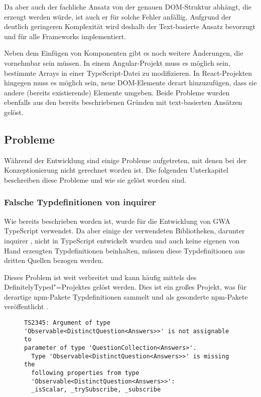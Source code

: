Da aber auch der fachliche Ansatz von der genauen \gls{DOM}-Struktur abhängt, die erzeugt werden würde, ist auch er für solche Fehler anfällig. Aufgrund der deutlich geringeren Komplexität wird deshalb der Text-basierte Ansatz bevorzugt und für alle Frameworks implementiert.

Neben dem Einfügen von Komponenten gibt es noch weitere Änderungen, die vornehmbar sein müssen. In einem Angular-Projekt muss es möglich sein, bestimmte Arrays in einer TypeScript-Datei zu modifizieren. In React-Projekten hingegen muss es möglich sein, neue \gls{DOM}-Elemente derart hinzuzufügen, dass sie andere (bereits existierende) Elemente umgeben. Beide Probleme wurden ebenfalls aus den bereits beschriebenen Gründen mit text-basierten Ansätzen gelöst.

\subsection{Probleme}
Während der Entwicklung sind einige Probleme aufgetreten, mit denen bei der Konzeptionierung nicht gerechnet worden ist. Die folgenden Unterkapitel beschreiben diese Probleme und wie sie gelöst worden sind.

\subsubsection{Falsche Typdefinitionen von inquirer}
\label{inquirer_type_issue}

Wie bereits beschrieben worden ist, wurde für die Entwicklung von \gls{GWA} TypeScript verwendet. Da aber einige der verwendeten Bibliotheken, darunter inquirer \cite{inquirer_package_json}, nicht in TypeScript entwickelt wurden und auch keine eigenen von Hand erzeugten Typdefinitionen beinhalten, müssen diese Typdefinitionen aus dritten Quellen bezogen werden.

Dieses Problem ist weit verbreitet und kann häufig mittels des DefinitelyTyped"=Projektes gelöst werden. Dies ist ein großes Projekt, was für derartige \gls{npm}-Pakete Typdefinitionen sammelt und als gesonderte \gls{npm}-Pakete veröffentlicht \cite{DT_github}.

\begin{figure}
\begin{lstlisting}[caption={TypeScript-Fehlermeldung bei der Verwendung von inquirer mit einem \mbox{RxJS-Observable}}, captionpos=b, label={code:inquirer_ts_error}]
TS2345: Argument of type
'Observable<DistinctQuestion<Answers>>' is not assignable to
parameter of type 'QuestionCollection<Answers>'.
  Type 'Observable<DistinctQuestion<Answers>>' is missing the
  following properties from type
  'Observable<DistinctQuestion<Answers>>':
  _isScalar, _trySubscribe, _subscribe
\end{lstlisting}
\end{figure}

